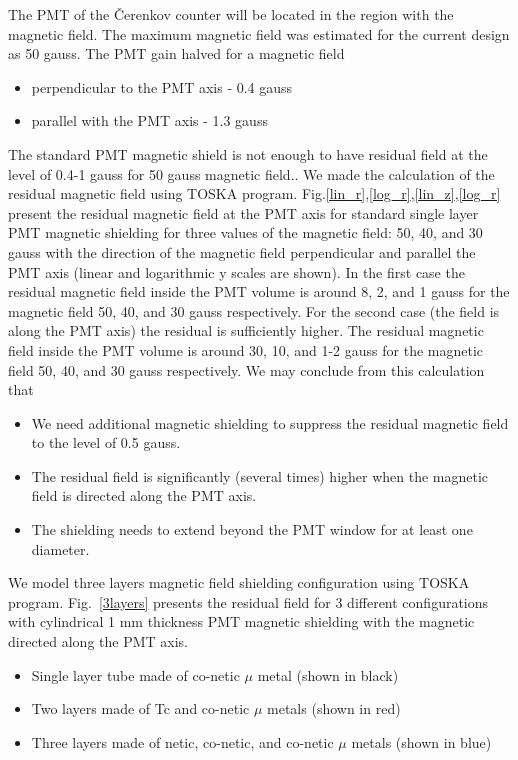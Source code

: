 \documentclass[11pt,titlepage]{article}
\begin{document}
The PMT of the \v Cerenkov counter will be located in the region with the magnetic field.
The maximum magnetic field was estimated for the current design as 50 gauss.
The PMT gain halved for a magnetic field
\begin{itemize}
\item perpendicular to the PMT axis      - 0.4 gauss
\item parallel with the PMT axis - 1.3 gauss
\end{itemize}
The standard PMT magnetic shield is not enough to have residual field at the level of 0.4-1 gauss
for 50 gauss magnetic field..
We made the calculation of the residual magnetic field using TOSKA program.
Fig.\ref{lin_r},\ref{log_r},\ref{lin_z},\ref{log_r} present the residual magnetic field at the PMT axis
for standard single layer PMT magnetic shielding for three values of the  magnetic field:
50, 40, and 30 gauss with the direction of the magnetic field perpendicular and parallel the PMT axis
(linear and logarithmic y scales are shown).
In the first case the residual magnetic field inside the PMT volume is around 8, 2, and 1 
gauss for the magnetic  field 50, 40, and 30 gauss respectively. 
For the second case (the field is along the PMT axis) the residual is sufficiently higher.
The residual magnetic field inside the PMT volume is around 30, 10, and 1-2  
gauss for the magnetic  field 50, 40, and 30 gauss respectively.
We may conclude from this calculation that
\begin{itemize}
\item We need additional magnetic shielding to suppress the residual magnetic field 
      to the level of 0.5 gauss.
\item The residual  field is significantly (several times) higher when the magnetic field is directed along the PMT axis.
\item The shielding needs to extend beyond the PMT window for at least one diameter.
\end{itemize}

We model three layers magnetic field shielding configuration using TOSKA program.
Fig.~\ref{3layers} presents the residual field for 3 different configurations
with cylindrical 1 mm thickness PMT magnetic shielding  with the magnetic directed along the PMT axis.
\begin{itemize}
\item Single layer tube made of  co-netic $\mu$ metal (shown in black)
\item Two layers  made of  Tc and co-netic $\mu$ metals (shown in red)
\item Three layers  made of  netic, co-netic, and co-netic $\mu$ metals (shown in blue)
\end{itemize}
\end{document}
